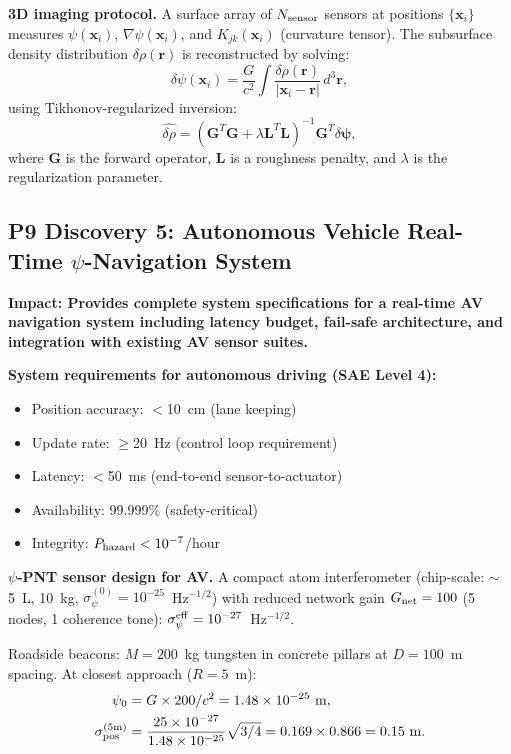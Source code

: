 \documentclass[aps,prd,twocolumn,superscriptaddress,nofootinbib]{revtex4-2}
\newcommand{\xvec}{\mathbf{x}}
\newcommand{\rvec}{\mathbf{r}}
\begin{document}
\textbf{3D imaging protocol.}
A surface array of $N_{\rm sensor}$ sensors at positions
$\{\xvec_i\}$ measures $\psi(\xvec_i)$, $\nabla\psi(\xvec_i)$,
and $K_{jk}(\xvec_i)$ (curvature tensor).  The subsurface density
distribution $\delta\rho(\rvec)$ is reconstructed by solving:
\begin{equation}
\delta\psi(\xvec_i) = \frac{G}{c^2}\int\frac{\delta\rho(\rvec)}
{|\xvec_i - \rvec|}\,d^3\rvec,
\label{eq:forward-model}
\end{equation}
using Tikhonov-regularized inversion:
\begin{equation}
\hat{\delta\rho} = (\mathbf{G}^T\mathbf{G} + \lambda\mathbf{L}^T
\mathbf{L})^{-1}\mathbf{G}^T\delta\boldsymbol{\psi},
\end{equation}
where $\mathbf{G}$ is the forward operator, $\mathbf{L}$ is a
roughness penalty, and $\lambda$ is the regularization parameter.

\subsection{P9 Discovery 5: Autonomous Vehicle Real-Time
$\psi$-Navigation System}

\textbf{Impact: Provides complete system specifications for a
real-time AV navigation system including latency budget, fail-safe
architecture, and integration with existing AV sensor suites.}

\textbf{System requirements for autonomous driving (SAE Level 4):}
\begin{itemize}
\item Position accuracy: $<$10~cm (lane keeping)
\item Update rate: $\geq$20~Hz (control loop requirement)
\item Latency: $<$50~ms (end-to-end sensor-to-actuator)
\item Availability: 99.999\% (safety-critical)
\item Integrity: $P_{\rm hazard} < 10^{-7}$/hour
\end{itemize}

\textbf{$\psi$-PNT sensor design for AV.}
A compact atom interferometer (chip-scale: $\sim$5~L, 10~kg,
$\sigma_\psi^{(0)} = 10^{-25}$~Hz$^{-1/2}$) with reduced network
gain $G_{\rm net} = 100$ (5 nodes, 1 coherence tone):
$\sigma_\psi^{\rm eff} = 10^{-27}$~Hz$^{-1/2}$.

Roadside beacons: $M = 200$~kg tungsten in concrete pillars at
$D = 100$~m spacing.  At closest approach ($R = 5$~m):
\begin{align}
\psi_0 &= G\times 200/c^2 = 1.48\times10^{-25}~\text{m}, \\
\sigma_{\rm pos}^{(5\text{m})} &= \frac{25\times 10^{-27}}
{1.48\times10^{-25}}\sqrt{3/4}
= 0.169\times 0.866 = 0.15~\text{m}.
\end{align}
\end{document}
